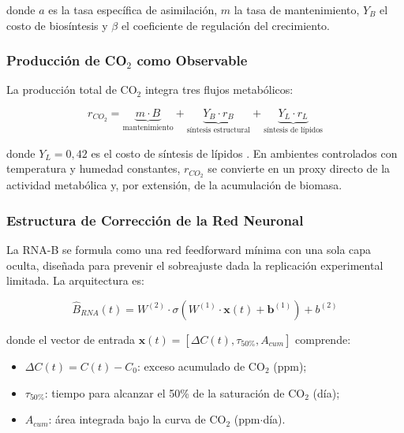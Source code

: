 \documentclass[12pt,a4paper]{article}
\begin{document}
donde $a$ es la tasa espec\'{i}fica de asimilaci\'{o}n, $m$ la tasa de mantenimiento, $Y_B$ el costo de bios\'{i}ntesis y $\beta$ el coeficiente de regulaci\'{o}n del crecimiento.

\subsubsection{Producci\'{o}n de CO$_2$ como Observable}

La producci\'{o}n total de CO$_2$ integra tres flujos metab\'{o}licos:

\begin{equation}
    r_{CO_2} = \underbrace{m \cdot B}_{\text{mantenimiento}} + \underbrace{Y_B \cdot r_B}_{\text{s\'{i}ntesis estructural}} + \underbrace{Y_L \cdot r_L}_{\text{s\'{i}ntesis de l\'{i}pidos}} \label{eq:co2_total}
\end{equation}

donde $Y_L = 0,42$ es el costo de s\'{i}ntesis de l\'{i}pidos \citep{kokPreliminaryProjectDesign2021}. En ambientes controlados con temperatura y humedad constantes, $r_{CO_2}$ se convierte en un proxy directo de la actividad metab\'{o}lica y, por extensi\'{o}n, de la acumulaci\'{o}n de biomasa.

\subsubsection{Estructura de Correcci\'{o}n de la Red Neuronal}

La RNA-B se formula como una red feedforward m\'{i}nima con una sola capa oculta, dise\~{n}ada para prevenir el sobreajuste dada la replicaci\'{o}n experimental limitada. La arquitectura es:

\begin{equation}
    \hat{B}_{RNA}(t) = W^{(2)} \cdot \sigma\left(W^{(1)} \cdot \mathbf{x}(t) + \mathbf{b}^{(1)}\right) + b^{(2)} \label{eq:rna}
\end{equation}

donde el vector de entrada $\mathbf{x}(t) = [\Delta C(t), \tau_{50\%}, A_{cum}]$ comprende:
\begin{itemize}
    \item $\Delta C(t) = C(t) - C_0$: exceso acumulado de CO$_2$ (ppm);
    \item $\tau_{50\%}$: tiempo para alcanzar el 50\% de la saturaci\'{o}n de CO$_2$ (d\'{i}a);
    \item $A_{cum}$: \'{a}rea integrada bajo la curva de CO$_2$ (ppm$\cdot$d\'{i}a).
\end{itemize}
\end{document}
